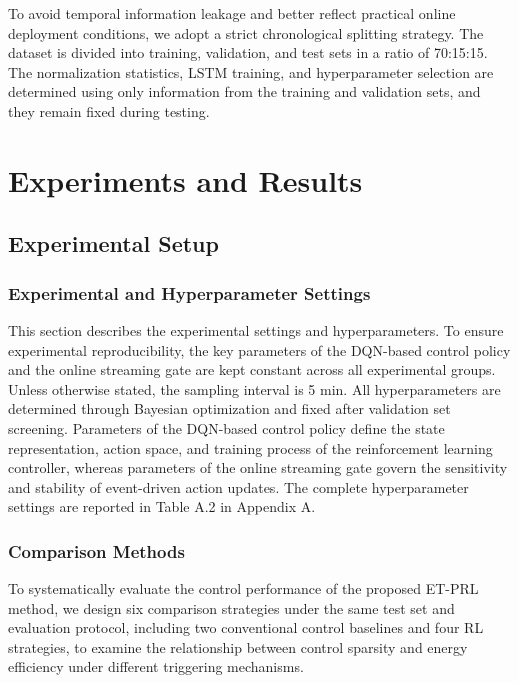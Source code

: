 ﻿\documentclass[preprint,12pt,number]{elsarticle}
\begin{document}
To avoid temporal information leakage and better reflect practical online deployment conditions, we adopt a strict chronological splitting strategy. The dataset is divided into training, validation, and test sets in a ratio of 70:15:15. The normalization statistics, LSTM training, and hyperparameter selection are determined using only information from the training and validation sets, and they remain fixed during testing.

\section{Experiments and Results}\label{experiments-and-results}

\subsection{Experimental Setup}\label{experimental-setup}

\subsubsection{Experimental and Hyperparameter Settings}\label{experimental-and-hyperparameter-settings}

This section describes the experimental settings and hyperparameters. To ensure experimental reproducibility, the key parameters of the DQN-based control policy and the online streaming gate are kept constant across all experimental groups. Unless otherwise stated, the sampling interval is 5 min. All hyperparameters are determined through Bayesian optimization and fixed after validation set screening. Parameters of the DQN-based control policy define the state representation, action space, and training process of the reinforcement learning controller, whereas parameters of the online streaming gate govern the sensitivity and stability of event-driven action updates. The complete hyperparameter settings are reported in Table A.2 in Appendix A.

\subsubsection{Comparison Methods}\label{comparison-methods}

To systematically evaluate the control performance of the proposed ET-PRL method, we design six comparison strategies under the same test set and evaluation protocol, including two conventional control baselines and four RL strategies, to examine the relationship between control sparsity and energy efficiency under different triggering mechanisms.
\end{document}
